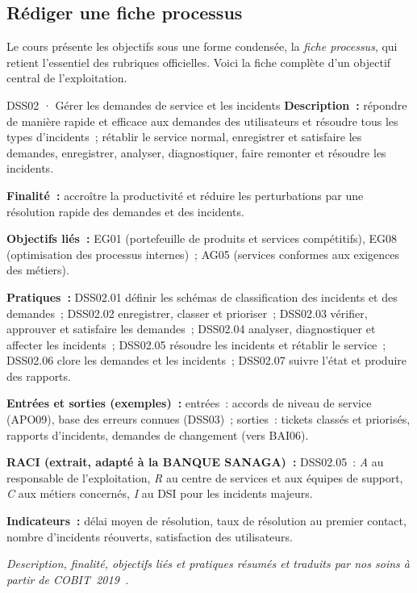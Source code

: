 \subsection{Rédiger une fiche processus}

Le cours présente les objectifs sous une forme condensée, la
\emph{fiche processus}, qui retient l'essentiel des rubriques officielles.
Voici la fiche complète d'un objectif central de l'exploitation.

\begin{boxobjet}{DSS02 · Gérer les demandes de service et les incidents}
\textbf{Description~:} répondre de manière rapide et efficace aux demandes
des utilisateurs et résoudre tous les types d'incidents~; rétablir le
service normal, enregistrer et satisfaire les demandes, enregistrer,
analyser, diagnostiquer, faire remonter et résoudre les incidents.

\textbf{Finalité~:} accroître la productivité et réduire les
perturbations par une résolution rapide des demandes et des incidents.

\textbf{Objectifs liés~:} EG01 (portefeuille de produits et services
compétitifs), EG08 (optimisation des processus internes)~; AG05 (services
conformes aux exigences des métiers).

\textbf{Pratiques~:} DSS02.01 définir les schémas de classification des
incidents et des demandes~; DSS02.02 enregistrer, classer et prioriser~;
DSS02.03 vérifier, approuver et satisfaire les demandes~; DSS02.04
analyser, diagnostiquer et affecter les incidents~; DSS02.05 résoudre les
incidents et rétablir le service~; DSS02.06 clore les demandes et les
incidents~; DSS02.07 suivre l'état et produire des rapports.

\textbf{Entrées et sorties (exemples)~:} entrées~: accords de niveau de
service (APO09), base des erreurs connues (DSS03)~; sorties~: tickets
classés et priorisés, rapports d'incidents, demandes de changement
(vers BAI06).

\textbf{RACI (extrait, adapté à la BANQUE SANAGA)~:} DSS02.05~: \emph{A}
au responsable de l'exploitation, \emph{R} au centre de services et aux
équipes de support, \emph{C} aux métiers concernés, \emph{I} au DSI pour
les incidents majeurs.

\textbf{Indicateurs~:} délai moyen de résolution, taux de résolution au
premier contact, nombre d'incidents réouverts, satisfaction des
utilisateurs.
\end{boxobjet}
{\small\itshape Description, finalité, objectifs liés et pratiques résumés
et traduits par nos soins à partir de COBIT~2019~\cite{isaca2018cobitobjectifs}.}


